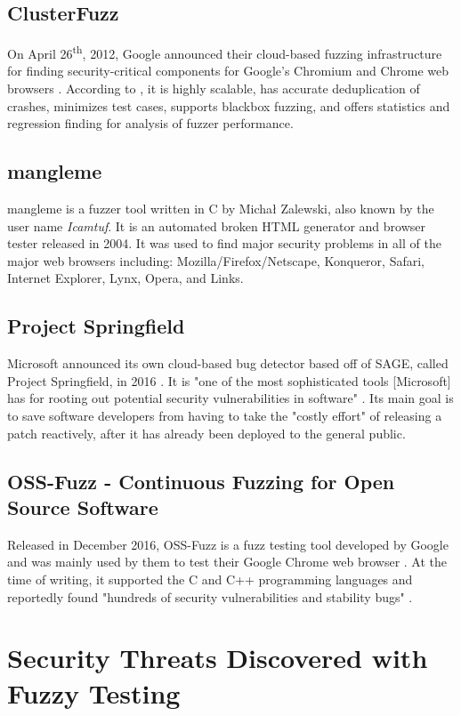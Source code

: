 \documentclass[10pt, final, journal, letterpaper, twoside, twocolumn]{IEEEtran}
\begin{document}
	\subsection{ClusterFuzz}
		On April 26\textsuperscript{th}, 2012, Google announced their cloud-based fuzzing infrastructure for finding security-critical components for Google's Chromium and Chrome web browsers \cite{clusterfuzz}. According to \cite{clusterfuzz}, it is highly scalable, has accurate deduplication of crashes, minimizes test cases, supports blackbox fuzzing, and offers statistics and regression finding for analysis of fuzzer performance.
		
	\subsection{mangleme}
		mangleme is a fuzzer tool written in C by Michał Zalewski, also known by the user name \textit{Icamtuf}. It is an automated broken HTML generator and browser tester released in 2004. It was used to find major security problems in all of the major web browsers including: Mozilla/Firefox/Netscape, Konqueror, Safari, Internet Explorer, Lynx, Opera, and Links.
		
	\subsection{Project Springfield}
	Microsoft announced its own cloud-based bug detector based off of SAGE, called Project Springfield, in 2016 \cite{springfield}. It is "one of the most sophisticated tools [Microsoft] has for rooting out potential security vulnerabilities in software" \cite{springfield}. Its main goal is to save software developers from having to take the "costly effort" of releasing a patch reactively, after it has already been deployed to the general public. 
		
	\subsection{OSS-Fuzz - Continuous Fuzzing for Open Source Software}
		Released in December 2016, OSS-Fuzz is a fuzz testing tool developed by Google and was mainly used by them to test their Google Chrome web browser \cite{oss-fuzz}. At the time of writing, it supported the C and C++ programming languages and reportedly found "hundreds of security vulnerabilities and stability bugs" \cite{oss-fuzz}.
		

\section{\label{sec:bugs}Security Threats Discovered with Fuzzy Testing}
\end{document}

